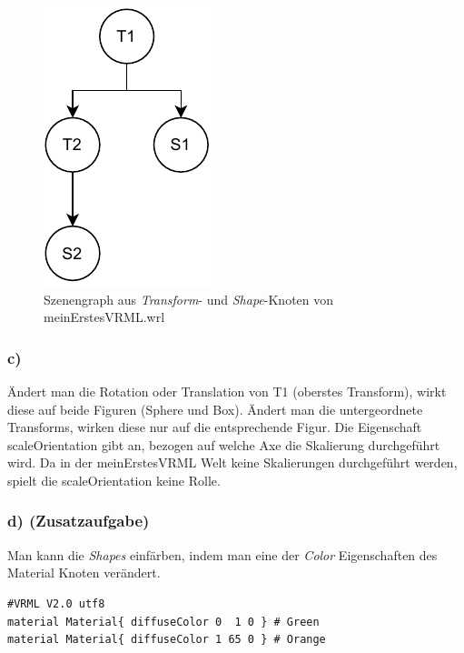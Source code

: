 \documentclass{article}
\begin{document}
\begin{figure}[!!h]
    \centering
    \includegraphics{V1_SceneGraph.pdf}
    \caption{Szenengraph aus \textit{Transform}- und \textit{Shape}-Knoten von meinErstesVRML.wrl}
\end{figure}


\subsubsection*{c)}
Ändert man die Rotation oder Translation von T1 (oberstes Transform), wirkt 
diese auf beide Figuren (Sphere und Box). Ändert man die untergeordnete
Transforms, wirken diese nur auf die entsprechende Figur. Die Eigenschaft
scaleOrientation gibt an, bezogen auf welche Axe die Skalierung durchgeführt
wird. Da in der meinErstesVRML Welt keine Skalierungen durchgeführt werden, 
spielt die scaleOrientation keine Rolle.

\subsubsection*{d) (Zusatzaufgabe)}
Man kann die \textit{Shapes} einfärben, indem man eine der \textit{Color}
Eigenschaften des Material Knoten verändert. 

\begin{lstlisting}[language=VRML]
#VRML V2.0 utf8
material Material{ diffuseColor 0  1 0 } # Green
material Material{ diffuseColor 1 65 0 } # Orange
\end{lstlisting}




\newpage 
\end{document}
